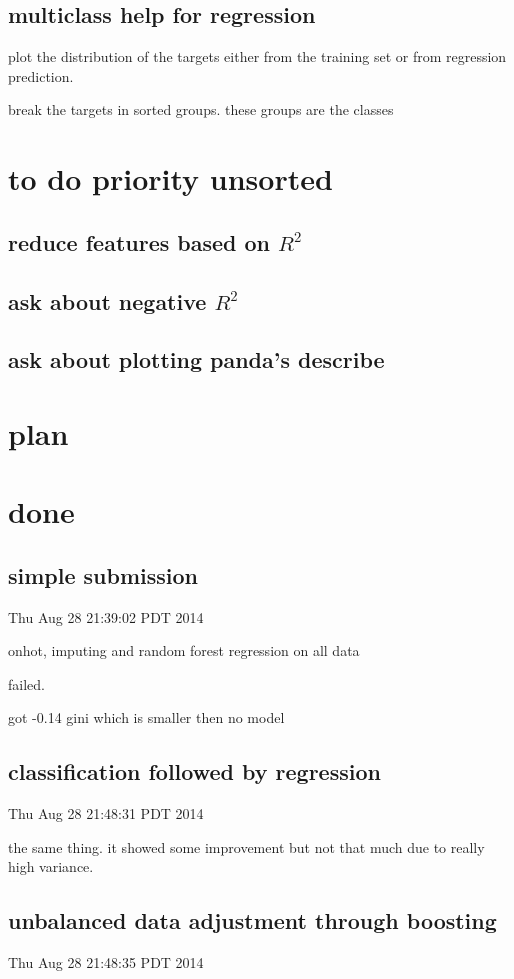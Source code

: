 \documentclass{article}
\begin{document}
\subsection{multiclass help for regression}

plot the distribution of the targets either from the training set or from regression prediction.

break the targets in sorted groups. these groups are the classes

\section{to do priority unsorted}
\subsection{reduce features based on $R^2$}
\subsection{ask about negative $R^2$}
\subsection{ask about plotting panda's describe}
\section{plan}
\section{done}
\subsection{simple submission}
Thu Aug 28 21:39:02 PDT 2014

onhot, imputing and random forest regression on all data

failed.

got -0.14 gini which is smaller then no model

\subsection{classification followed by regression}
Thu Aug 28 21:48:31 PDT 2014

the same thing. it showed some improvement but not that much due to really high variance.

\subsection{unbalanced data adjustment through boosting}
Thu Aug 28 21:48:35 PDT 2014
\end{document}
